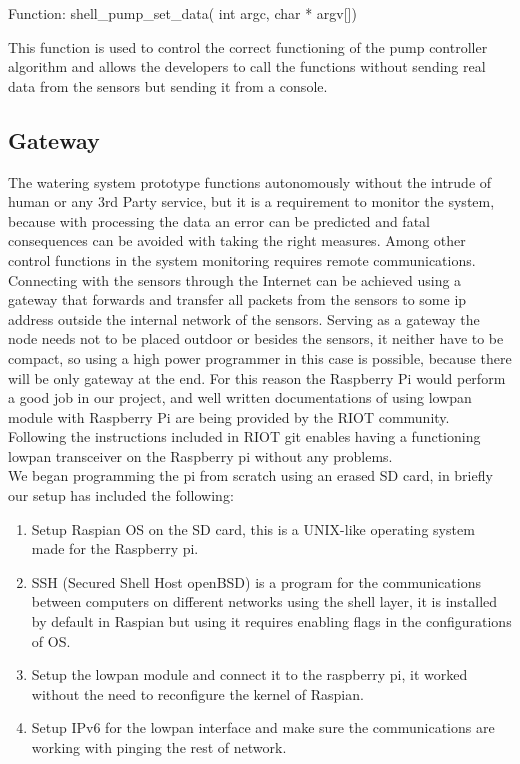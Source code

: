 \documentclass[11pt,paper=a4,parskip=half]{scrartcl}
\begin{document}
Function: shell\_pump\_set\_data( int argc, char * argv[])

This function is used to control the correct functioning of the pump controller algorithm and allows the developers to call the functions without sending real data from the sensors but sending it from a console.
\subsection{Gateway}  

The watering system prototype functions autonomously without the intrude of human or any 3rd Party service, but it is a requirement to monitor the system, because with processing the data an error can be predicted and fatal consequences can be avoided with taking the right measures. Among other control functions in the system monitoring requires remote communications.
Connecting with the sensors through the Internet can be achieved using a gateway that forwards and transfer all packets from the sensors to some ip address outside the internal network of the sensors. Serving as a gateway  the node needs not to be placed outdoor or besides the sensors, it neither have to be compact, so using a high power programmer in this case is possible, because there will be only gateway at the end. For this reason the Raspberry Pi would perform a good job in our project, and well written documentations of using lowpan module with Raspberry Pi are being provided by the RIOT community. Following the instructions included in RIOT git \cite{lowpan} enables having a functioning lowpan transceiver on the Raspberry pi without any problems. \\
We began programming the pi from scratch using an erased SD card, in briefly our setup has included the following:
\begin{enumerate}
	\item Setup Raspian OS on the SD card, this is a UNIX-like operating system made for the Raspberry pi.
	\item SSH (Secured Shell Host  openBSD) is a program for the communications between computers on different networks using the shell layer, it is installed by default in Raspian but using it requires enabling flags in the configurations of OS.
	\item Setup the lowpan module and connect it to the raspberry pi, it worked without the need to reconfigure the kernel of Raspian. 
	\item Setup IPv6 for the lowpan interface and make sure the communications are working with pinging the rest of network.
\end{enumerate}
\end{document}
